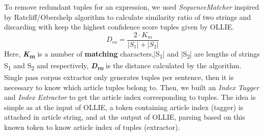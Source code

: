 To remove redundant tuples for an expression, we used \textit{SequenceMatcher} inspired by Ratcliff/Obershelp algorithm to calculate similarity ratio of two strings and discarding with keep the highest confidence score tuples given by OLLIE.
$$D_{ro} = \frac{2\cdot K_m}{|S_1| + |S_2|}$$
Here, \textbf{\textit{K}\textsubscript{\textit{m}}} is a number of \textbf{matching} characters,|S\textsubscript{1}| and |S\textsubscript{2}| are lengths of strings S\textsubscript{1} and S\textsubscript{2} and respectively, \textbf{{\textit{D}\textsubscript{\textit{ro}}}} is the distance calculated by the algorithm.\\
Single pass corpus extractor only generates tuples per sentence, then it is necessary to know which article tuples belong to. Then, we built an \textit{Index Tagger} and \textit{Index Extractor} to get the article index corresponding to tuples. The idea is simple as at the input of OLLIE, a token containing article index (tagger) is attached in article string, and at the output of OLLIE, parsing based on this known token to know article index of tuples (extractor).

